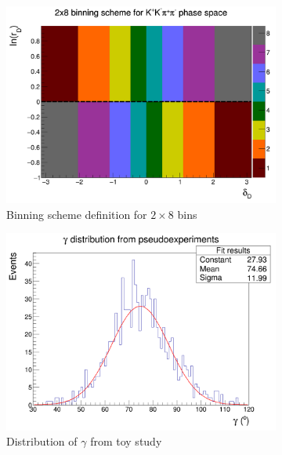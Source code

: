 \documentclass[12pt, a4paper, notitlepage, onecolumn]{article}
\numberwithin{equation}{section}
\begin{document}
\begin{figure}[H] 
  \centering
  \begin{subfigure}{0.5\textwidth}
    \centering
    \includegraphics[width=1\textwidth]{Plots/BinningSchemePlot.png}
    \caption{Binning scheme definition for $2\times 8$ bins}
    \label{fig_binning_scheme}
  \end{subfigure}%
  \begin{subfigure}{0.5\textwidth}
    \centering
    \includegraphics[width=1\textwidth]{Plots/GammaDistribution8BinsVariableWidth.png}
    \caption{Distribution of $\gamma$ from toy study}
    \label{fig_gamma_pull_study}
  \end{subfigure}
  \caption{}
\end{figure}
\end{document}
